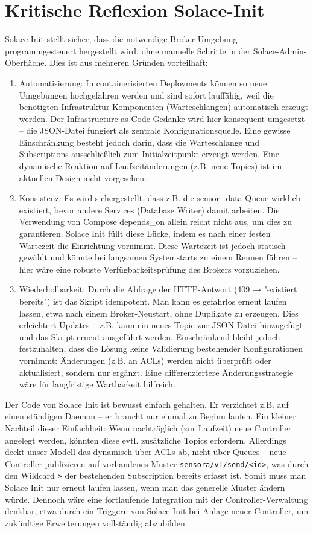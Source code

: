 \section{Kritische Reflexion Solace-Init}
Solace Init stellt sicher, dass die notwendige Broker-Umgebung programmgesteuert hergestellt wird, ohne manuelle Schritte in der Solace-Admin-Oberfläche. Dies ist aus mehreren Gründen vorteilhaft:
\begin{enumerate}
    \item Automatisierung: In containerisierten Deployments können so neue Umgebungen hochgefahren werden und sind sofort lauffähig, weil die benötigten Infrastruktur-Komponenten (Warteschlangen) automatisch erzeugt werden. Der Infrastructure-as-Code-Gedanke wird hier konsequent umgesetzt – die JSON-Datei fungiert als zentrale Konfigurationsquelle. Eine gewisse Einschränkung besteht jedoch darin, dass die Warteschlange und Subscriptions ausschließlich zum Initialzeitpunkt erzeugt werden. Eine dynamische Reaktion auf Laufzeitänderungen (z.B. neue Topics) ist im aktuellen Design nicht vorgesehen.
    \item Konsistenz: Es wird sichergestellt, dass z.B. die sensor\_data Queue wirklich existiert, bevor andere Services (Database Writer) damit arbeiten. Die Verwendung von Compose depends\_on allein reicht nicht aus, um dies zu garantieren. Solace Init füllt diese Lücke, indem es nach einer festen Wartezeit die Einrichtung vornimmt. Diese Wartezeit ist jedoch statisch gewählt und könnte bei langsamen Systemstarts zu einem Rennen führen – hier wäre eine robuste Verfügbarkeitsprüfung des Brokers vorzuziehen.
    \item Wiederholbarkeit: Durch die Abfrage der HTTP-Antwort (409 → "existiert bereits") ist das Skript idempotent. Man kann es gefahrlos erneut laufen lassen, etwa nach einem Broker-Neustart, ohne Duplikate zu erzeugen. Dies erleichtert Updates – z.B. kann ein neues Topic zur JSON-Datei hinzugefügt und das Skript erneut ausgeführt werden. Einschränkend bleibt jedoch festzuhalten, dass die Lösung keine Validierung bestehender Konfigurationen vornimmt: Änderungen (z.B. an ACLs) werden nicht überprüft oder aktualisiert, sondern nur ergänzt. Eine differenziertere Änderungsstrategie wäre für langfristige Wartbarkeit hilfreich.
\end{enumerate}

Der Code von Solace Init ist bewusst einfach gehalten. Er verzichtet z.B. auf einen ständigen Daemon – er braucht nur einmal zu Beginn laufen. Ein kleiner Nachteil dieser Einfachheit: Wenn nachträglich (zur Laufzeit) neue Controller angelegt werden, könnten diese evtl. zusätzliche Topics erfordern. Allerdings deckt unser Modell das dynamisch über ACLs ab, nicht über Queues – neue Controller publizieren auf vorhandenes Muster \texttt{sensora/v1/send/<id>}, was durch den Wildcard \texttt{>} der bestehenden Subscription bereits erfasst ist. Somit muss man Solace Init nur erneut laufen lassen, wenn man das generelle Muster ändern würde. Dennoch wäre eine fortlaufende Integration mit der Controller-Verwaltung denkbar, etwa durch ein Triggern von Solace Init bei Anlage neuer Controller, um zukünftige Erweiterungen vollständig abzubilden.


